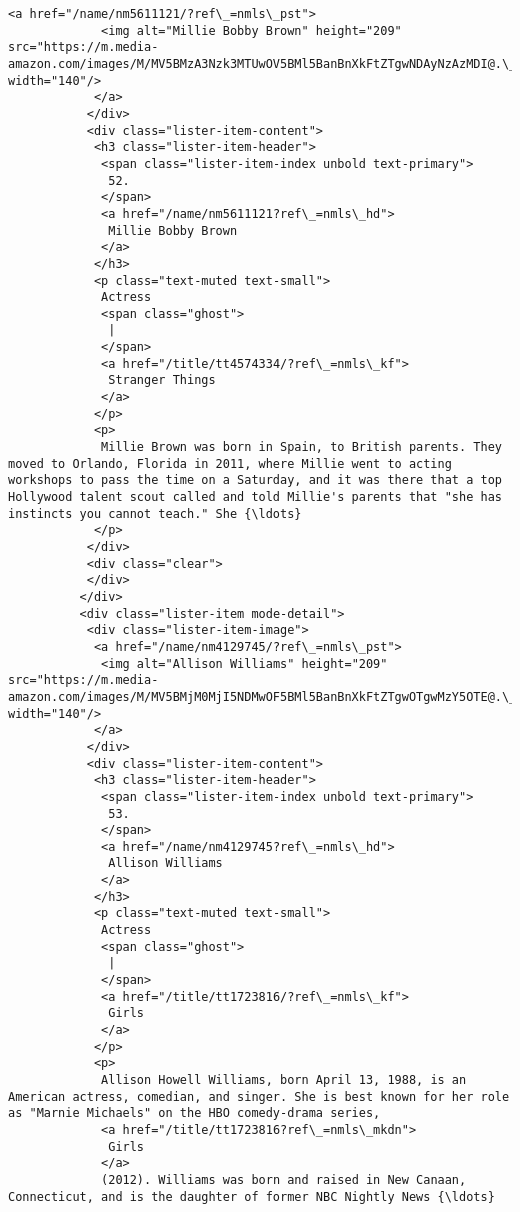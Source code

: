 \documentclass[11pt]{article}
\begin{document}
\begin{Verbatim}[commandchars=\\\{\}]
            <a href="/name/nm5611121/?ref\_=nmls\_pst">
             <img alt="Millie Bobby Brown" height="209" src="https://m.media-amazon.com/images/M/MV5BMzA3Nzk3MTUwOV5BMl5BanBnXkFtZTgwNDAyNzAzMDI@.\_V1\_UY209\_CR12,0,140,209\_AL\_.jpg" width="140"/>
            </a>
           </div>
           <div class="lister-item-content">
            <h3 class="lister-item-header">
             <span class="lister-item-index unbold text-primary">
              52.
             </span>
             <a href="/name/nm5611121?ref\_=nmls\_hd">
              Millie Bobby Brown
             </a>
            </h3>
            <p class="text-muted text-small">
             Actress
             <span class="ghost">
              |
             </span>
             <a href="/title/tt4574334/?ref\_=nmls\_kf">
              Stranger Things
             </a>
            </p>
            <p>
             Millie Brown was born in Spain, to British parents. They moved to Orlando, Florida in 2011, where Millie went to acting workshops to pass the time on a Saturday, and it was there that a top Hollywood talent scout called and told Millie's parents that "she has instincts you cannot teach." She {\ldots}
            </p>
           </div>
           <div class="clear">
           </div>
          </div>
          <div class="lister-item mode-detail">
           <div class="lister-item-image">
            <a href="/name/nm4129745/?ref\_=nmls\_pst">
             <img alt="Allison Williams" height="209" src="https://m.media-amazon.com/images/M/MV5BMjM0MjI5NDMwOF5BMl5BanBnXkFtZTgwOTgwMzY5OTE@.\_V1\_UX140\_CR0,0,140,209\_AL\_.jpg" width="140"/>
            </a>
           </div>
           <div class="lister-item-content">
            <h3 class="lister-item-header">
             <span class="lister-item-index unbold text-primary">
              53.
             </span>
             <a href="/name/nm4129745?ref\_=nmls\_hd">
              Allison Williams
             </a>
            </h3>
            <p class="text-muted text-small">
             Actress
             <span class="ghost">
              |
             </span>
             <a href="/title/tt1723816/?ref\_=nmls\_kf">
              Girls
             </a>
            </p>
            <p>
             Allison Howell Williams, born April 13, 1988, is an American actress, comedian, and singer. She is best known for her role as "Marnie Michaels" on the HBO comedy-drama series,
             <a href="/title/tt1723816?ref\_=nmls\_mkdn">
              Girls
             </a>
             (2012). Williams was born and raised in New Canaan, Connecticut, and is the daughter of former NBC Nightly News {\ldots}

\end{Verbatim}
\end{document}
